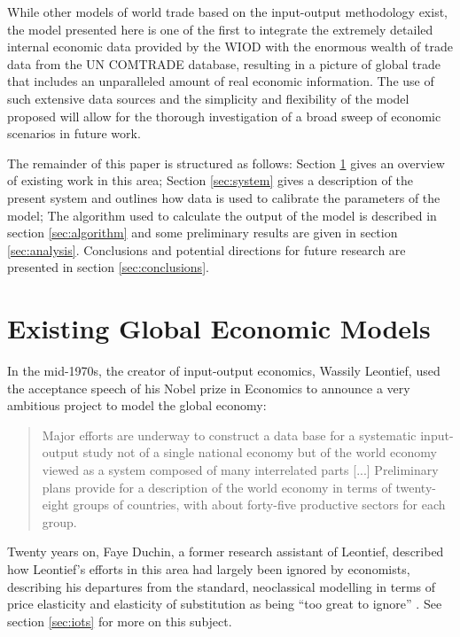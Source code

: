 \documentclass[a4paper]{article}
\begin{document}
While other models of world trade based on the input-output methodology exist, the model presented here is one of the first to integrate the extremely detailed internal economic data provided by the WIOD with the enormous wealth of trade data from the UN COMTRADE database, resulting in a picture of global trade that includes an unparalleled amount of real economic information.
The use of such extensive data sources and the simplicity and flexibility of the model proposed will allow for the thorough investigation of a broad sweep of economic scenarios in future work.

The remainder of this paper is structured as follows: 
Section \ref{sec:litreview} gives an overview of existing work in this area;
Section \ref{sec:system} gives a description of the present system and outlines how data is used to calibrate the parameters of the model;
The algorithm used to calculate the output of the model is described in section \ref{sec:algorithm} and some preliminary results are given in section \ref{sec:analysis}.
Conclusions and potential directions for future research are presented in section \ref{sec:conclusions}.

\section{Existing Global Economic Models} \label{sec:litreview}
In the mid-1970s, the creator of input-output economics, Wassily Leontief, used the acceptance speech of his Nobel prize in Economics to announce a very ambitious project to model the global economy:

\begin{quotation}
Major efforts are underway to construct a data base for a systematic input-output study not of a single national economy but of the world economy viewed as a system composed of many interrelated parts [...]
Preliminary plans provide for a description of the world economy in terms of twenty-eight groups of countries, with about forty-five productive sectors for each group. 
\end{quotation}

Twenty years on, Faye Duchin, a former research assistant of Leontief, described how Leontief's efforts in this area had largely been ignored by economists, describing his departures from the standard, neoclassical modelling in terms of price elasticity and elasticity of substitution as being ``too great to ignore'' \parencite{duchin_international_2004}. 
See section \ref{sec:iots} for more on this subject.
\end{document}
